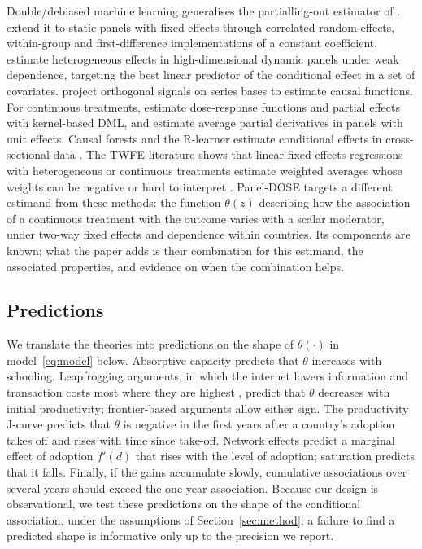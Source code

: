 \documentclass[pdflatex,sn-basic]{sn-jnl}%
\theoremstyle{thmstyleone}
\theoremstyle{thmstyletwo}
\begin{document}
Double/debiased machine learning \citep{chernozhukov2018dml} generalises the partialling-out estimator of \citet{robinson1988}. \citet{clarke2023panel} extend it to static panels with fixed effects through correlated-random-effects, within-group and first-difference implementations of a constant coefficient. \citet{semenova2023panel} estimate heterogeneous effects in high-dimensional dynamic panels under weak dependence, targeting the best linear predictor of the conditional effect in a set of covariates. \citet{semenova2021cate} project orthogonal signals on series bases to estimate causal functions. For continuous treatments, \citet{colangelo2026continuous} estimate dose-response functions and partial effects with kernel-based DML, and \citet{klosin2022continuous} estimate average partial derivatives in panels with unit effects. Causal forests and the R-learner estimate conditional effects in cross-sectional data \citep{wager2018forest,athey2019grf,nie2021quasi}. The TWFE literature shows that linear fixed-effects regressions with heterogeneous or continuous treatments estimate weighted averages whose weights can be negative or hard to interpret \citep{dechaisemartin2020twfe,callaway2024continuous}. Panel-DOSE targets a different estimand from these methods: the function $\theta(z)$ describing how the association of a continuous treatment with the outcome varies with a scalar moderator, under two-way fixed effects and dependence within countries. Its components are known; what the paper adds is their combination for this estimand, the associated properties, and evidence on when the combination helps.

\subsection{Predictions}\label{sec:pred}

We translate the theories into predictions on the shape of $\theta(\cdot)$ in model~\eqref{eq:model} below. Absorptive capacity \citep{nelson1966,benhabib1994,akerman2015broadband} predicts that $\theta$ increases with schooling. Leapfrogging arguments, in which the internet lowers information and transaction costs most where they are highest \citep{hjort2019internet}, predict that $\theta$ decreases with initial productivity; frontier-based arguments \citep{acemoglu2006frontier} allow either sign. The productivity J-curve \citep{brynjolfsson2021jcurve} predicts that $\theta$ is negative in the first years after a country's adoption takes off and rises with time since take-off. Network effects predict a marginal effect of adoption $f'(d)$ that rises with the level of adoption; saturation predicts that it falls. Finally, if the gains accumulate slowly, cumulative associations over several years should exceed the one-year association. Because our design is observational, we test these predictions on the shape of the conditional association, under the assumptions of Section~\ref{sec:method}; a failure to find a predicted shape is informative only up to the precision we report.
\end{document}
